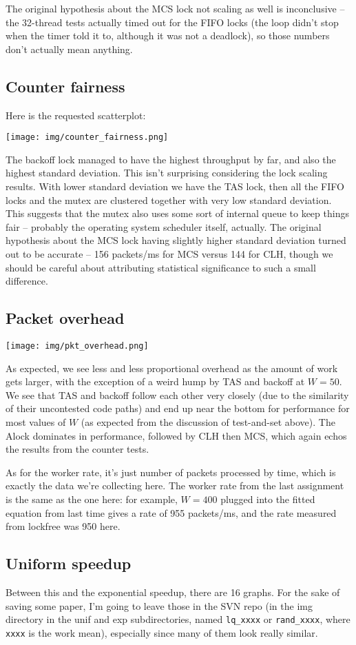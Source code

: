 \documentclass{article}
\begin{document}
The original hypothesis about the MCS lock not scaling as well is inconclusive -- the 32-thread tests actually timed out for the FIFO locks (the loop didn't stop when the timer told it to, although it was not a deadlock), so those numbers don't actually mean anything.
\subsection*{Counter fairness}
Here is the requested scatterplot:

\texttt{[image: img/counter\_fairness.png]}

The backoff lock managed to have the highest throughput by far, and also the highest standard deviation. This isn't surprising considering the lock scaling results. With lower standard deviation we have the TAS lock, then all the FIFO locks and the mutex are clustered together with very low standard deviation. This suggests that the mutex also uses some sort of internal queue to keep things fair -- probably the operating system scheduler itself, actually. The original hypothesis about the MCS lock having slightly higher standard deviation turned out to be accurate -- 156 packets/ms for MCS versus 144 for CLH, though we should be careful about attributing statistical significance to such a small difference.

\subsection*{Packet overhead}
\texttt{[image: img/pkt\_overhead.png]}

As expected, we see less and less proportional overhead as the amount of work gets larger, with the exception of a weird hump by TAS and backoff at $W=50$. We see that TAS and backoff follow each other very closely (due to the similarity of their uncontested code paths) and end up near the bottom for performance for most values of $W$ (as expected from the discussion of test-and-set above). The Alock dominates in performance, followed by CLH then MCS, which again echos the results from the counter tests. 

As for the worker rate, it's just number of packets processed by time, which is exactly the data we're collecting here. The worker rate from the last assignment is the same as the one here: for example, $W=400$ plugged into the fitted equation from last time gives a rate of 955 packets/ms, and the rate measured from lockfree was 950 here.
\subsection*{Uniform speedup}
Between this and the exponential speedup, there are 16 graphs. For the sake of saving some paper, I'm going to leave those in the SVN repo (in the img directory in the unif and exp subdirectories, named \verb|lq_xxxx| or \verb|rand_xxxx|, where \verb|xxxx| is the work mean), especially since many of them look really similar. 
\end{document}
